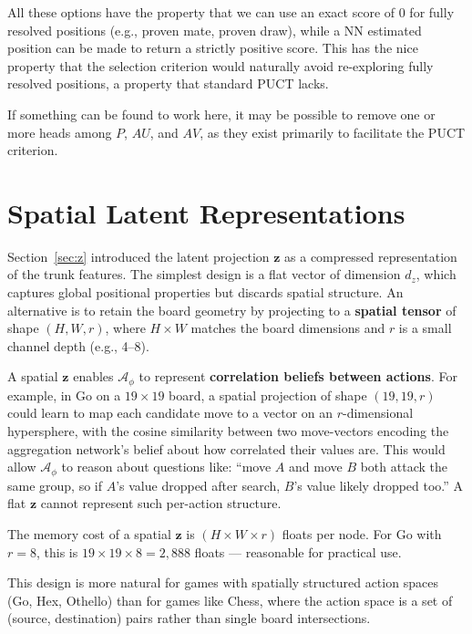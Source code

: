 \documentclass[11pt]{article}
\begin{document}
All these options have the property that we can use an exact score of 0 for
fully resolved positions (e.g., proven mate, proven draw), while a NN estimated
position can be made to return a strictly positive score. This has the nice
property that the selection criterion would naturally avoid re-exploring 
fully resolved positions, a property that standard PUCT lacks.

If something can be found to work here, it may be possible to remove one or more
heads among $P$, $AU$, and $AV$, as they exist primarily to facilitate the
PUCT criterion. 

\section{Spatial Latent Representations}
\label{sec:spatial-z}

Section~\ref{sec:z} introduced the latent projection $\mathbf{z}$ as a
compressed representation of the trunk features. The simplest design is a flat
vector of dimension $d_z$, which captures global positional properties but
discards spatial structure. An alternative is to retain the board geometry by
projecting to a \textbf{spatial tensor} of shape $(H, W, r)$, where $H \times
W$ matches the board dimensions and $r$ is a small channel depth (e.g., 4--8).

A spatial $\mathbf{z}$ enables $\mathcal{A}_\phi$ to represent
\textbf{correlation beliefs between actions}. For example, in Go on a $19
\times 19$ board, a spatial projection of shape $(19, 19, r)$ could learn to
map each candidate move to a vector on an $r$-dimensional hypersphere, with the
cosine similarity between two move-vectors encoding the aggregation network's
belief about how correlated their values are. This would allow
$\mathcal{A}_\phi$ to reason about questions like: ``move $A$ and move $B$
both attack the same group, so if $A$'s value dropped after search, $B$'s
value likely dropped too.'' A flat $\mathbf{z}$ cannot represent such
per-action structure.

The memory cost of a spatial $\mathbf{z}$ is $(H \times W \times r)$ floats
per node. For Go with $r = 8$, this is $19 \times 19 \times 8 = 2{,}888$
floats --- reasonable for practical use.

This design is more natural for games with spatially structured action spaces
(Go, Hex, Othello) than for games like Chess, where the action space is a set
of (source, destination) pairs rather than single board intersections.
\end{document}
